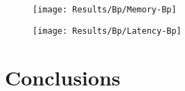 \begin{figure}[htbp]
    \centering
    \texttt{[image: Results/Bp/Memory-Bp]}
    \label{fig:gantt}
\end{figure}

\begin{figure}[htbp]
    \centering
    \texttt{[image: Results/Bp/Latency-Bp]}
    \label{fig:gantt}
\end{figure}

\section{Conclusions} %
\label{sec:conclusions}